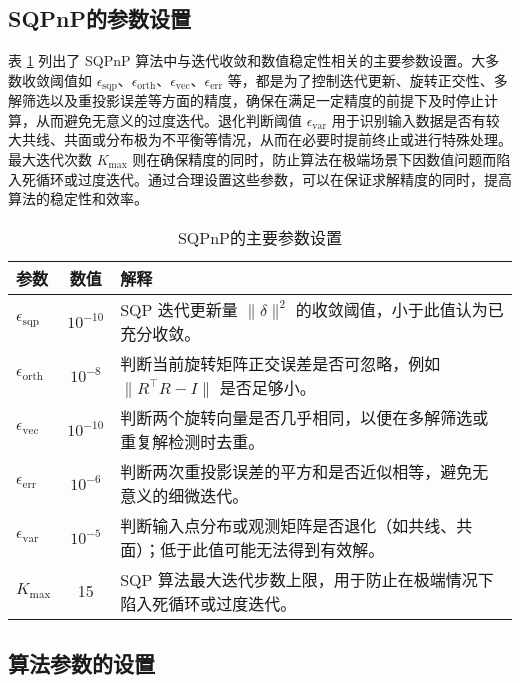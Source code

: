 \subsection{SQPnP的参数设置}
表 \ref{tab:sqpnp-params} 列出了 SQPnP 算法中与迭代收敛和数值稳定性相关的主要参数设置。大多数收敛阈值如 \(\epsilon_{\mathrm{sqp}}\)、\(\epsilon_{\mathrm{orth}}\)、\(\epsilon_{\mathrm{vec}}\)、\(\epsilon_{\mathrm{err}}\) 等，都是为了控制迭代更新、旋转正交性、多解筛选以及重投影误差等方面的精度，确保在满足一定精度的前提下及时停止计算，从而避免无意义的过度迭代。退化判断阈值 \(\epsilon_{\mathrm{var}}\) 用于识别输入数据是否有较大共线、共面或分布极为不平衡等情况，从而在必要时提前终止或进行特殊处理。最大迭代次数 \(K_{\mathrm{max}}\) 则在确保精度的同时，防止算法在极端场景下因数值问题而陷入死循环或过度迭代。通过合理设置这些参数，可以在保证求解精度的同时，提高算法的稳定性和效率。
\begin{table}[htbp]
	\centering
	\caption{SQPnP的主要参数设置}
	\label{tab:sqpnp-params}
	\begin{tabular}{l c p{7.5cm}}
		\toprule
		参数 & 数值} & 解释 \\
		\midrule
		
		$\epsilon_{\mathrm{sqp}}$      & $10^{-10}$ & 
		SQP 迭代更新量 $\|\delta\|^2$ 的收敛阈值，小于此值认为已充分收敛。\\[3pt]
		
		$\epsilon_{\mathrm{orth}}$     & $10^{-8}$  & 
		判断当前旋转矩阵正交误差是否可忽略，例如 $\|R^\top R - I\|$ 是否足够小。\\[3pt]
		
		$\epsilon_{\mathrm{vec}}$      & $10^{-10}$ &
		判断两个旋转向量是否几乎相同，以便在多解筛选或重复解检测时去重。\\[3pt]
		
		$\epsilon_{\mathrm{err}}$      & $10^{-6}$  &
		判断两次重投影误差的平方和是否近似相等，避免无意义的细微迭代。\\[3pt]
		
		$\epsilon_{\mathrm{var}}$      & $10^{-5}$  &
		判断输入点分布或观测矩阵是否退化（如共线、共面）；低于此值可能无法得到有效解。\\[3pt]
		
		$K_{\mathrm{max}}$             & 15         &
		SQP 算法最大迭代步数上限，用于防止在极端情况下陷入死循环或过度迭代。\\
		\bottomrule
	\end{tabular}
\end{table}


\subsection{算法参数的设置}

